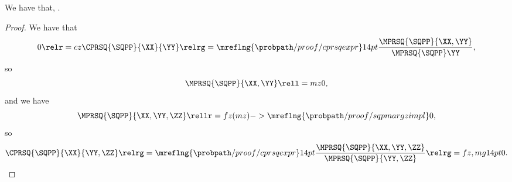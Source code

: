 \begin{proposition}
  We have that, \sqppzerocindprop.%
\end{proposition}

\begin{proof}
  We have that 
  $$0 \relr = cz \CPRSQ{\SQPP}{\XX}{\YY} \relrg = {\mreflng{\probpath/proof/cprsqexpr}} 14pt \frac{\MPRSQ{\SQPP}{\XX, \YY}}{\MPRSQ{\SQPP}\YY},$$
  so 
  $$\MPRSQ{\SQPP}{\XX, \YY} \rell = mz 0,$$
  and we have
  $$\MPRSQ{\SQPP}{\XX, \YY, \ZZ} \rellr = fz (mz)->{\mreflng{\probpath/proof/sqpmargzimpl}} 0,$$
  so
  $$\CPRSQ{\SQPP}{\XX}{\YY, \ZZ} \relrg = {\mreflng{\probpath/proof/cprsqexpr}} 14pt \frac{\MPRSQ{\SQPP}{\XX, \YY, \ZZ}}{\MPRSQ{\SQPP}{\YY,\ZZ}} \relrg = fz,mg 14pt 0.$$
\end{proof}
